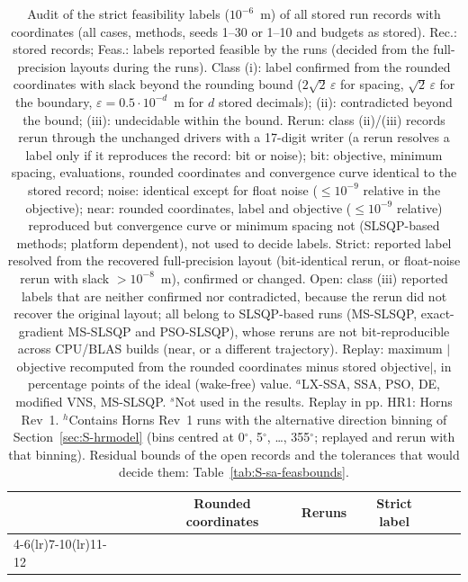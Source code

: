 \begin{table}[!htbp]
\centering
\caption{Audit of the strict feasibility labels ($10^{-6}$~m) of all stored run records with coordinates
(all cases, methods, seeds 1--30 or 1--10 and budgets as stored).
Rec.: stored records; Feas.: labels reported feasible by the runs (decided from the full-precision layouts during the runs).
Class (i): label confirmed from the rounded coordinates with slack beyond the rounding bound
($2\sqrt2\,\varepsilon$ for spacing, $\sqrt2\,\varepsilon$ for the boundary, $\varepsilon=0.5\cdot10^{-d}$~m for $d$
stored decimals); (ii): contradicted beyond the bound; (iii): undecidable within the bound. Rerun: class (ii)/(iii)
records rerun through the unchanged drivers with a 17-digit writer (a rerun resolves a label only if it reproduces the record: bit or noise); bit: objective, minimum spacing, evaluations,
rounded coordinates and convergence curve identical to the stored record; noise: identical except for float noise
($\le10^{-9}$ relative in the objective); near: rounded coordinates, label and objective ($\le10^{-9}$ relative)
reproduced but convergence curve or minimum spacing not (SLSQP-based methods; platform dependent), not used to
decide labels. Strict: reported label resolved from the recovered full-precision layout (bit-identical
rerun, or float-noise rerun with slack $>10^{-8}$~m), confirmed or changed. Open: class (iii) reported labels that are neither confirmed nor
contradicted, because the rerun did not recover the original layout; all belong to SLSQP-based runs (MS-SLSQP, exact-gradient MS-SLSQP and PSO-SLSQP), whose reruns are not
bit-reproducible across CPU/BLAS builds (near, or a different trajectory). Replay: maximum $|$objective recomputed from
the rounded coordinates minus stored objective$|$, in percentage points of the ideal (wake-free) value.
$^a$LX-SSA, SSA, PSO, DE, modified VNS, MS-SLSQP. $^s$Not used in the results.
Replay in pp. HR1: Horns Rev~1. $^h$Contains Horns Rev~1 runs with the alternative direction binning of Section~\ref{sec:S-hrmodel} (bins centred at 0$^\circ$, 5$^\circ$, \ldots, 355$^\circ$; replayed and rerun with that binning). Residual bounds of the open records and the tolerances that would decide them: Table~\ref{tab:S-sa-feasbounds}.}
\label{tab:S-sa-precision}
\scriptsize\setlength{\tabcolsep}{1.5pt}
\begin{tabular}{lrrrrrrrrrrrrr}
\toprule
& & & \multicolumn{3}{c}{Rounded coordinates} & \multicolumn{4}{c}{Reruns} & \multicolumn{2}{c}{Strict label} & & \\
\cmidrule(lr){4-6}\cmidrule(lr){7-10}\cmidrule(lr){11-12}

\end{tabular}
\end{table}
